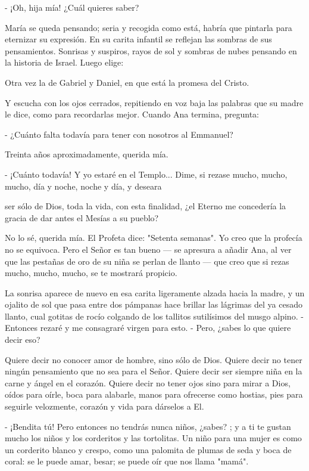 \documentclass[12pt]{book} %
\begin{document}
- ¡Oh, hija mía! ¿Cuál quieres saber? 

María se queda pensando; seria y recogida como está, habría que pintarla para eternizar su expresión. En su carita infantil se reflejan las sombras de sus pensamientos. Sonrisas y suspiros, rayos de sol y sombras de nubes pensando en la historia de Israel. Luego elige: 

Otra vez la de Gabriel y Daniel, en que está la promesa del Cristo. 

Y escucha con los ojos cerrados, repitiendo en voz baja las palabras que su madre le dice, como para recordarlas mejor. Cuando Ana termina, pregunta: 

- ¿Cuánto falta todavía para tener con nosotros al Emmanuel? 

Treinta años aproximadamente, querida mía. 

- ¡Cuánto todavía! Y yo estaré en el Templo... Dime, si rezase mucho, mucho, mucho, día y noche, noche y día, y deseara 

ser sólo de Dios, toda la vida, con esta finalidad, ¿el Eterno me concedería la gracia de dar antes el Mesías a su pueblo? 

No lo sé, querida mía. El Profeta dice: "Setenta semanas". Yo creo que la profecía no se equivoca. Pero el Señor es tan bueno — se apresura a añadir Ana, al ver que las pestañas de oro de su niña se perlan de llanto — que creo que si rezas mucho, mucho, mucho, se te mostrará propicio. 

La sonrisa aparece de nuevo en esa carita ligeramente alzada hacia la madre, y un ojalito de sol que pasa entre dos pámpanas hace brillar las lágrimas del ya cesado llanto, cual gotitas de rocío colgando de los tallitos sutilísimos del musgo alpino. - Entonces rezaré y me consagraré virgen para esto. - Pero, ¿sabes lo que quiere decir eso? 

Quiere decir no conocer amor de hombre, sino sólo de Dios. Quiere decir no tener ningún pensamiento que no sea para el Señor. Quiere decir ser siempre niña en la carne y ángel en el corazón. Quiere decir no tener ojos sino para mirar a Dios, oídos para oírle, boca para alabarle, manos para ofrecerse como hostias, pies para seguirle velozmente, corazón y vida para dárselos a El. 

- ¡Bendita tú! Pero entonces no tendrás nunca niños, ¿sabes? ; y a ti te gustan mucho los niños y los corderitos y las tortolitas. Un niño para una mujer es como un corderito blanco y crespo, como una palomita de plumas de seda y boca de coral: se le puede amar, besar; se puede oír que nos llama "mamá". 
\end{document}
